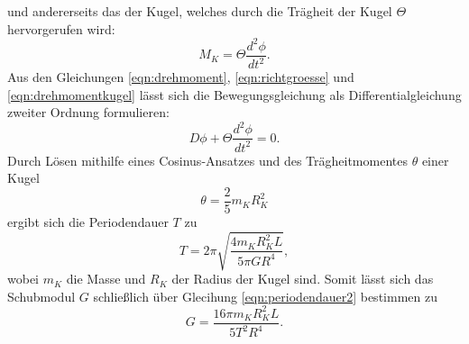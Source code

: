     und andererseits das der Kugel, welches durch die Trägheit der Kugel $\Theta$ hervorgerufen wird: 
    \begin{equation}
    \label{eqn:drehmomentkugel}
    M_K = \Theta \frac{d^2\phi}{dt^2}.
    \end{equation}
    Aus den Gleichungen \eqref{eqn:drehmoment}, \eqref{eqn:richtgroesse} und \eqref{eqn:drehmomentkugel} lässt sich die Bewegungsgleichung
    als Differentialgleichung zweiter Ordnung formulieren:
    \begin{equation}
    \label{eqn:diffgleichung}
    D \phi + \Theta \frac{d^2\phi}{dt^2} = 0 .
    \end{equation}
    Durch Lösen mithilfe eines Cosinus-Ansatzes und des Trägheitmomentes $\theta$ einer Kugel
    \begin{equation}
        \label{eqn:traegheit}
        \theta = \frac{2}{5} m_K R_K^{2}
    \end{equation}    
    ergibt sich die Periodendauer $T$ zu
    \begin{equation}
    \label{eqn:periodendauer2}
    T = 2 \pi \sqrt{\frac{4 m_K R_K^{2} L}{5 \pi G R^4 }},
    \end{equation}
    wobei $m_K$ die Masse und $R_K$ der Radius der Kugel sind.
    Somit lässt sich das Schubmodul $G$ schließlich über Glecihung \eqref{eqn:periodendauer2} bestimmen zu
    \begin{equation}
    \label{eqn:schubmodul}
    G = \frac{16 \pi m_K R_K^{2} L}{5 T^2 R^4}.
    \end{equation}
